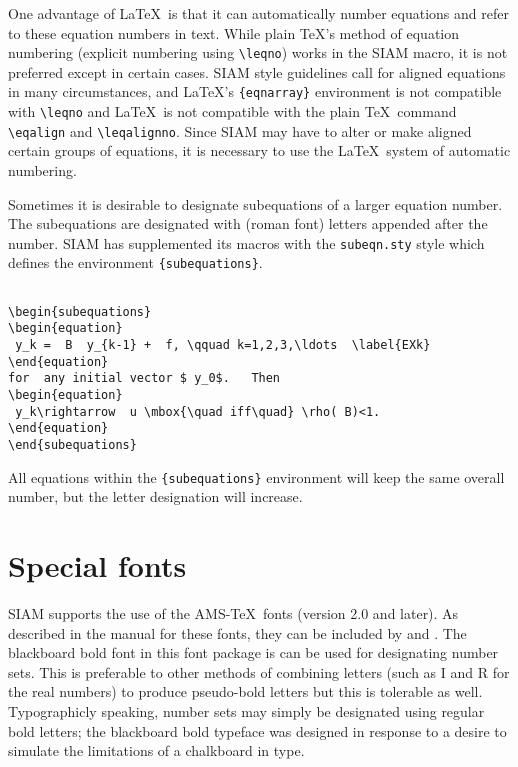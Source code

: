 One advantage of \LaTeX\ is that it can automatically number
equations and refer to these equation numbers in text. While plain \TeX's
method of equation numbering (explicit numbering using
\verb|\leqno|) works in the SIAM macro, it is not preferred
except in certain cases. SIAM style guidelines call for
aligned equations in many circumstances, and \LaTeX's 
\verb|{eqnarray}| environment is not compatible with
\verb|\leqno| and \LaTeX\ is not compatible with the plain
\TeX\ command \verb|\eqalign| and \verb|\leqalignno|. Since
SIAM may have to alter or make aligned certain groups of
equations, it is necessary to use the \LaTeX\ system of
automatic numbering.

Sometimes it is desirable to designate subequations of a larger
equation number. The subequations are designated with
(roman font) letters appended after the number. SIAM has
supplemented its macros with the {\tt subeqn.sty} style which
defines the environment \verb|{subequations}|.

\begin{verbatim}

\begin{subequations}
\begin{equation}
 y_k =  B  y_{k-1} +  f, \qquad k=1,2,3,\ldots  \label{EXk}
\end{equation}
for  any initial vector $ y_0$.   Then 
\begin{equation}
 y_k\rightarrow  u \mbox{\quad iff\quad} \rho( B)<1.
\end{equation}
\end{subequations}

\end{verbatim}

All equations within the \verb|{subequations}| environment
will keep the same overall number, but the letter
designation will increase.


\section{Special fonts}

SIAM supports the use of the AMS-\TeX\ fonts (version 2.0
and later). As described in the manual for these fonts,
they can be included by \verb|| and
\verb||. The blackboard bold font in this
font package is can be used for designating number sets. 
This is preferable to other methods of combining letters
(such as I and R for the real numbers) to produce pseudo-bold
letters but this is tolerable as well. Typographicly speaking,
number sets may simply be designated using regular bold letters; 
the blackboard bold typeface was designed in response to a desire
to simulate the limitations of a chalkboard in type.

